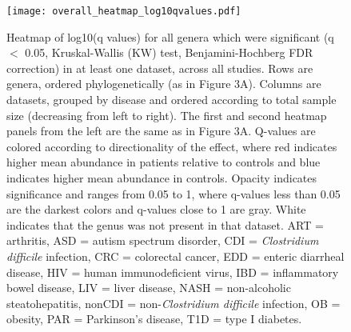 \documentclass{article}
\begin{document}
{\begin{figure}[h]
	\begin{center}
	\texttt{[image: overall\_heatmap\_log10qvalues.pdf]}
	\caption{Heatmap of log10(q values) for all genera which were significant (q $<$ 0.05, Kruskal-Wallis (KW) test, Benjamini-Hochberg FDR correction) in at least one dataset, across all studies. Rows are genera, ordered phylogenetically (as in Figure 3A). Columns are datasets, grouped by disease and ordered according to total sample size (decreasing from left to right). The first and second heatmap panels from the left are the same as in Figure 3A. Q-values are colored according to directionality of the effect, where red indicates higher mean abundance in patients relative to controls and blue indicates higher mean abundance in controls. Opacity indicates significance and ranges from 0.05 to 1, where q-values less than 0.05 are the darkest colors and q-values close to 1 are gray. White indicates that the genus was not present in that dataset. ART = arthritis, ASD = autism spectrum disorder, CDI = \textit{Clostridium difficile} infection, CRC = colorectal cancer, EDD = enteric diarrheal disease, HIV = human immunodeficient virus, IBD = inflammatory bowel disease, LIV = liver disease, NASH = non-alcoholic steatohepatitis, nonCDI = non-\textit{Clostridium difficile} infection, OB = obesity, PAR = Parkinson's disease, T1D = type I diabetes.
}
	\label{fig:overall_heatmap_qvalues}
	\end{center}
\end{figure}

}
\end{document}
